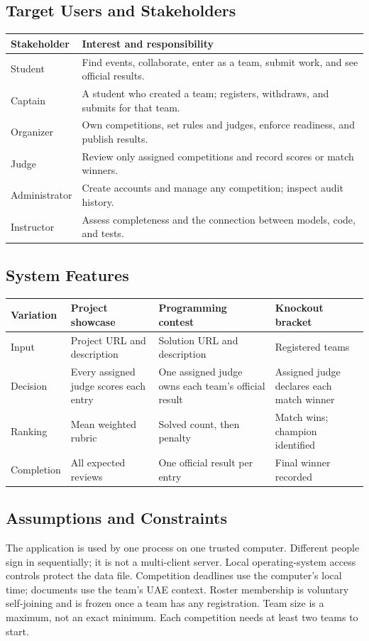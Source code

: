 \subsection{Target Users and Stakeholders}
\begin{tabularx}{\linewidth}{lY}\toprule Stakeholder & Interest and responsibility\\\midrule
Student & Find events, collaborate, enter as a team, submit work, and see official results.\\
Captain & A student who created a team; registers, withdraws, and submits for that team.\\
Organizer & Own competitions, set rules and judges, enforce readiness, and publish results.\\
Judge & Review only assigned competitions and record scores or match winners.\\
Administrator & Create accounts and manage any competition; inspect audit history.\\
Instructor & Assess completeness and the connection between models, code, and tests.\\\bottomrule\end{tabularx}
\subsection{System Features}
\begin{tabularx}{\linewidth}{lYYY}\toprule Variation & Project showcase & Programming contest & Knockout bracket\\\midrule
Input & Project URL and description & Solution URL and description & Registered teams\\
Decision & Every assigned judge scores each entry & One assigned judge owns each team's official result & Assigned judge declares each match winner\\
Ranking & Mean weighted rubric & Solved count, then penalty & Match wins; champion identified\\
Completion & All expected reviews & One official result per entry & Final winner recorded\\\bottomrule\end{tabularx}
\subsection{Assumptions and Constraints}
The application is used by one process on one trusted computer. Different people sign in sequentially; it is not a multi-client server. Local operating-system access controls protect the data file. Competition deadlines use the computer's local time; documents use the team's UAE context. Roster membership is voluntary self-joining and is frozen once a team has any registration. Team size is a maximum, not an exact minimum. Each competition needs at least two teams to start.

